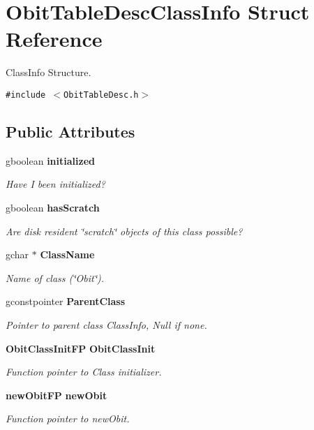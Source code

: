 \section{Obit\-Table\-Desc\-Class\-Info Struct Reference}
\label{structObitTableDescClassInfo}
Class\-Info Structure.  


{\tt \#include $<$Obit\-Table\-Desc.h$>$}

\subsection*{Public Attributes}
\begin{CompactItemize}
\item 
gboolean {\bf initialized}
\begin{CompactList}\small\item\em Have I been initialized? \item\end{CompactList}\item 
gboolean {\bf has\-Scratch}
\begin{CompactList}\small\item\em Are disk resident \char`\"{}scratch\char`\"{} objects of this class possible? \item\end{CompactList}\item 
gchar $\ast$ {\bf Class\-Name}
\begin{CompactList}\small\item\em Name of class (\char`\"{}Obit\char`\"{}). \item\end{CompactList}\item 
gconstpointer {\bf Parent\-Class}
\begin{CompactList}\small\item\em Pointer to parent class Class\-Info, Null if none. \item\end{CompactList}\item 
{\bf Obit\-Class\-Init\-FP} {\bf Obit\-Class\-Init}
\begin{CompactList}\small\item\em Function pointer to Class initializer. \item\end{CompactList}\item 
{\bf new\-Obit\-FP} {\bf new\-Obit}
\begin{CompactList}\small\item\em Function pointer to new\-Obit. \item\end{CompactList}\item 

\end{CompactItemize}
